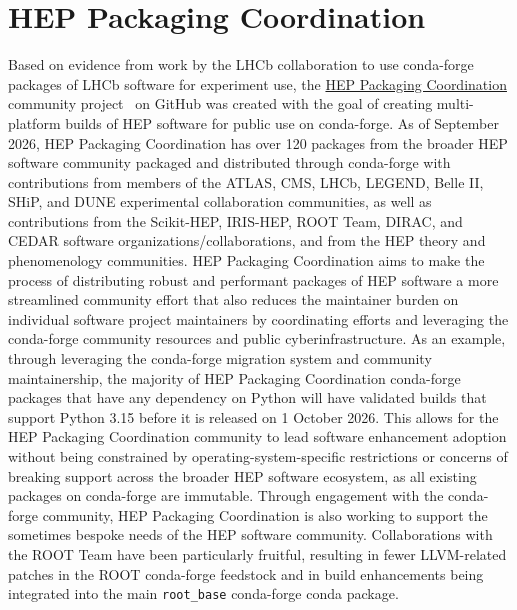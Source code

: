 \section{HEP Packaging Coordination}\label{sec:hep-packaging-coordination}

Based on evidence from work by the LHCb collaboration to use conda-forge packages of LHCb software for experiment use, the \href{https://hep-packaging-coordination.github.io/.github/}{HEP Packaging Coordination} community project~\cite{hep_packaging_coordination} on GitHub was created with the goal of creating multi-platform builds of HEP software for public use on conda-forge.
As of September 2026, HEP Packaging Coordination has over 120 packages from the broader HEP software community packaged and distributed through conda-forge with contributions from members of the ATLAS, CMS, LHCb, LEGEND, Belle II, SHiP, and DUNE experimental collaboration communities, as well as contributions from the Scikit-HEP, IRIS-HEP, ROOT Team, DIRAC, and CEDAR software organizations/collaborations, and from the HEP theory and phenomenology communities.
HEP Packaging Coordination aims to make the process of distributing robust and performant packages of HEP software a more streamlined community effort that also reduces the maintainer burden on individual software project maintainers by coordinating efforts and leveraging the conda-forge community resources and public cyberinfrastructure.
As an example, through leveraging the conda-forge migration system and community maintainership, the majority of HEP Packaging Coordination conda-forge packages that have any dependency on Python will have validated builds that support Python 3.15 before it is released on 1 October 2026.
This allows for the HEP Packaging Coordination community to lead software enhancement adoption without being constrained by operating-system-specific restrictions or concerns of breaking support across the broader HEP software ecosystem, as all existing packages on conda-forge are immutable.
Through engagement with the conda-forge community, HEP Packaging Coordination is also working to support the sometimes bespoke needs of the HEP software community.
Collaborations with the ROOT Team have been particularly fruitful, resulting in fewer LLVM-related patches in the ROOT conda-forge feedstock and in build enhancements being integrated into the main \texttt{root\_base} conda-forge conda package.
